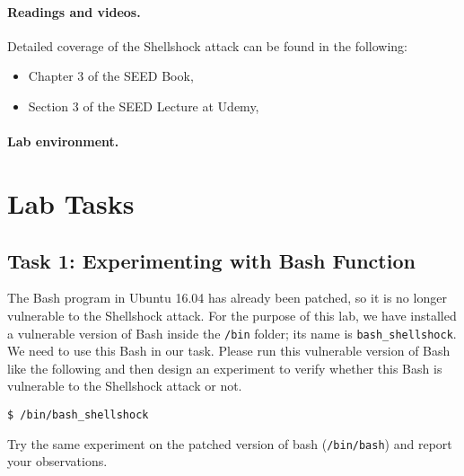 \paragraph{Readings and videos.}
Detailed coverage of the Shellshock attack can be found in the following:

\begin{itemize}
\item Chapter 3 of the SEED Book, \seedbook
\item Section 3 of the SEED Lecture at Udemy, \seedcsvideo
\end{itemize}


\paragraph{Lab environment.} \seedenvironment




\section{Lab Tasks}


\subsection{Task 1: Experimenting with Bash Function}


The Bash program in Ubuntu 16.04 has already been patched, so it is no
longer vulnerable to the Shellshock attack. For the purpose of this lab, we
have installed a vulnerable version of Bash inside the \texttt{/bin}
folder; its name is \texttt{bash\_shellshock}. We need to use 
this Bash in our task. Please run this vulnerable version of Bash like the
following and then design an experiment to verify whether this Bash is
vulnerable to the Shellshock attack or not. 

\begin{lstlisting}
$ /bin/bash_shellshock
\end{lstlisting}
 

Try the same experiment on the patched version of bash (\texttt{/bin/bash})
and report your observations.



